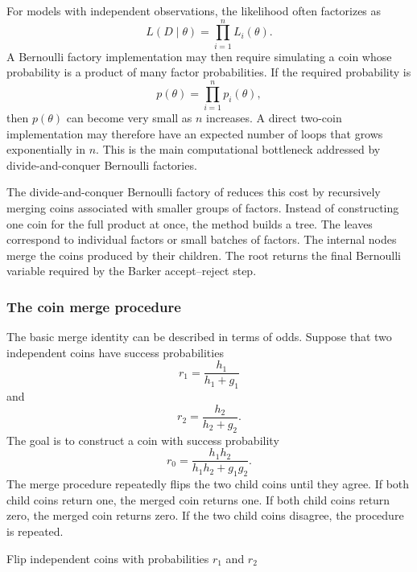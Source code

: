 For models with independent observations, the likelihood often factorizes as
\begin{equation}
L(D \mid \theta)
=
\prod_{i=1}^n L_i(\theta).
\end{equation}
A Bernoulli factory implementation may then require simulating a coin whose probability is a product of many factor probabilities.
If the required probability is
\begin{equation}
p(\theta)
=
\prod_{i=1}^n p_i(\theta),
\end{equation}
then $p(\theta)$ can become very small as $n$ increases.
A direct two-coin implementation may therefore have an expected number of loops that grows exponentially in $n$.
This is the main computational bottleneck addressed by divide-and-conquer Bernoulli factories.

The divide-and-conquer Bernoulli factory of  reduces this cost by recursively merging coins associated with smaller groups of factors.
Instead of constructing one coin for the full product at once, the method builds a tree.
The leaves correspond to individual factors or small batches of factors.
The internal nodes merge the coins produced by their children.
The root returns the final Bernoulli variable required by the Barker accept--reject step.

\subsubsection{The coin merge procedure}

The basic merge identity can be described in terms of odds.
Suppose that two independent coins have success probabilities
\begin{equation}
r_1
=
\frac{h_1}{h_1+g_1}
\end{equation}
and
\begin{equation}
r_2
=
\frac{h_2}{h_2+g_2}.
\end{equation}
The goal is to construct a coin with success probability
\begin{equation}
r_0
=
\frac{h_1h_2}{h_1h_2+g_1g_2}.
\end{equation}
The merge procedure repeatedly flips the two child coins until they agree.
If both child coins return one, the merged coin returns one.
If both child coins return zero, the merged coin returns zero.
If the two child coins disagree, the procedure is repeated.

\begin{algorithm}[H]
    Flip independent coins with probabilities $r_1$ and $r_2$\;
    \caption{Coin merge algorithm}
    \label{alg:coinmerge}
\end{algorithm}

